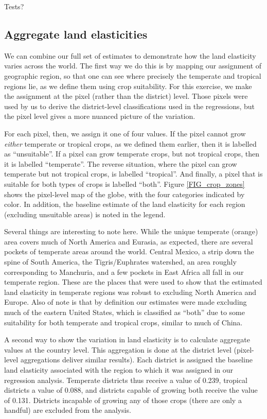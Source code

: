 \documentclass[11pt]{article}
\begin{document}
Tests?


\subsection{Aggregate land elasticities}
We can combine our full set of estimates to demonstrate how the land elasticity varies across the world. The first way we do this is by mapping our assignment of geographic region, so that one can see where precisely the temperate and tropical regions lie, as we define them using crop suitability. For this exercise, we make the assignment at the pixel (rather than the district) level. Those pixels were used by us to derive the district-level classifications used in the regressions, but the pixel level gives a more nuanced picture of the variation. 

For each pixel, then, we assign it one of four values. If the pixel cannot grow \textit{either} temperate or tropical crops, as we defined them earlier, then it is labelled as ``unsuitable''. If a pixel can grow temperate crops, but not tropical crops, then it is labelled ``temperate''. The reverse situation, where the pixel can grow temperate but not tropical crops, is labelled ``tropical''. And finally, a pixel that is suitable for both types of crops is labelled ``both''. Figure \ref{FIG_crop_zones} shows the pixel-level map of the globe, with the four categories indicated by color. In addition, the baseline estimate of the land elasticity for each region (excluding unsuitable areas) is noted in the legend. 

Several things are interesting to note here. While the unique temperate (orange) area covers much of North America and Eurasia, as expected, there are several pockets of temperate areas around the world. Central Mexico, a strip down the spine of South America, the Tigris/Euphrates watershed, an area roughly corresponding to Manchuria, and a few pockets in East Africa all fall in our temperate region. These are the places that were used to show that the estimated land elasticity in temperate regions was robust to excluding North America and Europe. Also of note is that by definition our estimates were made excluding much of the eastern United States, which is classified as ``both'' due to some suitability for both temperate and tropical crops, similar to much of China. 

A second way to show the variation in land elasticity is to calculate aggregate values at the country level. This aggregation is done at the district level (pixel-level aggregations deliver similar results). Each district is assigned the baseline land elasticity associated with the region to which it was assigned in our regression analysis. Temperate districts thus receive a value of 0.239, tropical districts a value of 0.088, and districts capable of growing both receive the value of 0.131. Districts incapable of growing any of those crops (there are only a handful) are excluded from the analysis. 
\end{document}
